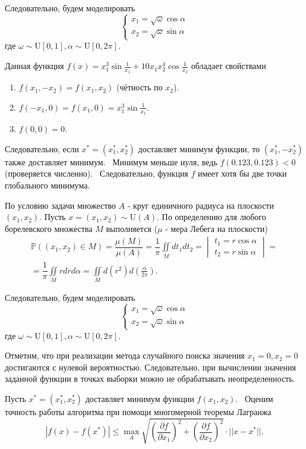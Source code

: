 \documentclass[11pt]{report}
\begin{document}
Следовательно, будем моделировать
$$
\begin{cases}
x_1 = \sqrt{\omega}\cos\alpha \\
x_2 = \sqrt{\omega}\sin\alpha
\end{cases}
$$
где $\omega\sim\mathrm{U}[0,1], \alpha\sim\mathrm{U}[0,2\pi]$.

Данная функция $f(x)=x_1^3\sin\frac{1}{x_1}+10x_1x_2^4\cos\frac{1}{x_2}$ обладает свойствами
\begin{enumerate}
\item $f(x_1,-x_2)=f(x_1,x_2)$ (чётность по $x_2$).
\item $f(-x_1,0)=f(x_1,0)=x_1^3\sin\frac{1}{x_1}$.
\item $f(0,0)=0$.
\end{enumerate}

Следовательно, если $x^*=(x_1^*,x_2^*)$ доставляет минимум функции, то $(x_1^*,-x_2^*)$ также доставляет минимум. \
Минимум меньше нуля, ведь $f(0.123, 0.123) < 0$ (проверяется численно). \
Следовательно, функция $f$ имеет хотя бы две точки глобального минимума.

По условию задачи множество $A$ - круг единичного радиуса на плоскости $(x_1,x_2)$. Пусть $x=(x_1,x_2)\sim\mathrm{U}(A)$. По определению для любого борелевского множества $M$ выполняется ($\mu$ - мера Лебега на плоскости)
\begin{multline*}
\mathbb{P}\left( (x_1,x_2)\in M \right) = \dfrac{\mu (M)}{\mu (A)} = \dfrac{1}{\pi}\iint\limits_M dt_1dt_2 = \begin{vmatrix}
t_1 = r\cos\alpha \\
t_2 = r\sin\alpha
\end{vmatrix} =\\
= \dfrac{1}{\pi}\iint\limits_M rdrd\alpha = \iint\limits_M d(r^2)d\left(\frac{\alpha}{2\pi}\right).
\end{multline*}

Следовательно, будем моделировать
$$
\begin{cases}
x_1 = \sqrt{\omega}\cos\alpha \\
x_2 = \sqrt{\omega}\sin\alpha
\end{cases}
$$
где $\omega\sim\mathrm{U}[0,1], \alpha\sim\mathrm{U}[0,2\pi]$.

Отметим, что при реализации метода случайного поиска значения $x_1=0, x_2=0$ достигаются с нулевой вероятностью. Следовательно, при вычислении значения заданной функции в точках выборки можно не обрабатывать неопределенность.

Пусть $x^*=(x_1^*,x_2^*)$ доставляет минимум функции $f(x_1,x_2)$. \
Оценим точность работы алгоритма при помощи многомерной теоремы Лагранжа
$$
|f(x) - f(x^*)| \leqslant \max\limits_A 
\sqrt{\left(\dfrac{\partial f}{\partial x_1}\right)^2 + \left(\dfrac{\partial f}{\partial x_2}\right)^2} \cdot || x - x^* ||.
$$
\end{document}
